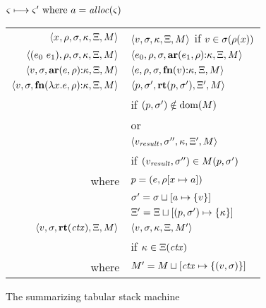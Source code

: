 \begin{figure}
  \centering
  $\varsigma \longmapsto \varsigma' \text{ where } a = \mathit{alloc}(\varsigma)$ \\
  \begin{tabular}{r|l}%
    \hline
    $\langle x^{{}}, \rho, \sigma, \kappa, \Xi, M \rangle$
    &
    $\langle v,\sigma,\kappa, \Xi, M \rangle$ if $v \in \sigma(\rho(x))$
    \\
    $\langle (e_{0}\ e_{1}){}, \rho, \sigma, \kappa, \Xi, M \rangle$
    &
    $\langle e_{0}, \rho, \sigma, \mathbf{ar}{}(e_{1},\rho){\tt :} \kappa, \Xi, M \rangle$
    \\
    $\langle v, \sigma, \mathbf{ar}{}(e,\rho){\tt :} \kappa, \Xi, M \rangle$
    &
    $\langle e, \rho, \sigma, \mathbf{fn}{}(v){\tt :} \kappa, \Xi, M \rangle$
    \\
    $\langle v,\sigma,\mathbf{fn}{}(\lambda{} x. e,\rho){\tt :} \kappa,\Xi,M \rangle$
    & %
    $\langle p,
          \sigma',
          \mathbf{rt}(p, \sigma'),
          \Xi',
          M \rangle$
     \\ & \quad if $(p, \sigma') \notin \text{dom}(M)$
\\
    & or \\
    & $\langle v_\mathit{result},
            \sigma'',
            \kappa,
            \Xi',
            M \rangle$ %
    \\ & \quad if $(v_\mathit{result},\sigma'') \in M(p,\sigma')$
    \\ %
    where & $p = (e, \rho[x \mapsto a])$ \\
          & $\sigma' = \sigma\sqcup[a \mapsto \{ v \}]$ \\
          & $\Xi' = \Xi\sqcup[(p, \sigma') \mapsto \{ \kappa \}]$
    \\
    $\langle v, \sigma, \mathbf{rt}(\mathit{ctx}), \Xi, M \rangle$
    &
    $\langle v, \sigma, \kappa, \Xi, M' \rangle$
    \\ & \quad if $\kappa \in \Xi(\mathit{ctx})$
    \\ where & $M' = M\sqcup[\mathit{ctx} \mapsto \{ (v,\sigma) \}]$
  \end{tabular}
  \caption{The summarizing tabular stack machine}
  \label{fig:summary-semantics}
\end{figure}

